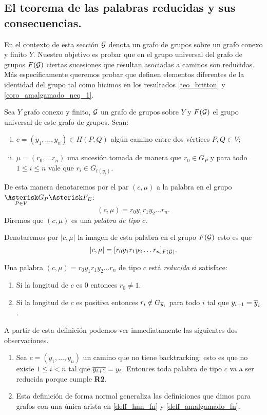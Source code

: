 \documentclass[tesis.tex]{subfiles}
\begin{document}
\subsection{ El teorema de las palabras reducidas y sus consecuencias.}

En el contexto de esta sección ${\cal G}$ denota un grafo de grupos sobre un grafo conexo y finito $Y$.
Nuestro objetivo es probar que en el grupo universal del grafo de grupos $F({\cal G})$ ciertas sucesiones que resultan asociadas a caminos son reducidas.
Más específicamente queremos probar que definen elementos diferentes de la identidad del grupo tal como hicimos en los resultados \ref{teo_britton} y \ref{coro_amalgamado_neq_1}.



\begin{deff}
	Sea $Y$ grafo conexo y finito, ${\cal G}$ un grafo de grupos sobre $Y$ y $F({\cal G})$ el grupo universal de este grafo de grupos.
	Sean:
	\begin{enumerate}[i)]
		\item $c=(y_1, \dots, y_n) \in \Pi(P,Q)$ algún camino entre dos vértices $P,Q \in V$;
		\item $\mu = (r_0, \dots r_n)$ una sucesión tomada de manera que $r_0 \in G_P$ y para todo $ 1 \le i \le n $ vale que $r_i \in G_{t(y_i)}$.
	\end{enumerate}
	De esta manera denotaremos por el par $(c, \mu)$ a la palabra en el grupo $\underset{P \in V}{\Asterisk} G_P \Asterisk F_E$:
	\[
	(c,\mu) = r_0 y_1 r_1 y_2 \dots r_n.
	\]
	Diremos que $(c, \mu)$ es una \emph{palabra de tipo $c$}.
\end{deff}
 
Denotaremos por $|c,\mu|$ la imagen de esta palabra en el grupo $F({\cal G})$ esto es que
\[
|c,\mu| = [r_0 y_1 r_1 y_2 \dots r_n]_{F({\cal G})}.
\]

\begin{deff}
	Una palabra $(c, \mu)=r_0 y_1 r_1 y_2 \dots r_n$ de tipo $c$ está \emph{reducida} si satisface:
	\begin{enumerate}[R1.]
		\item Si la longitud de $c$ es $0$ entonces $r_0 \neq 1$.
		\item Si la longitud de $c$ es positiva entonces $r_i \notin G_{\overline y_{i}}$ para todo $i$ tal que $y_{i+1} = \overline y_{i}$.
	\end{enumerate}
\end{deff}
A partir de esta definición podemos ver inmediatamente las siguientes dos observaciones.
\begin{enumerate}[1.]
	\item Sea $c=(y_1, \dots, y_n)$ un camino que no tiene backtracking: esto es que no existe $1 \le i  < n$ tal que $\overline {y_{i+1}} = y_{i}$.
	Entonces toda palabra de tipo $c$ va a ser reducida porque cumple \textbf{R2}.
	
	\item Esta definición de forma normal generaliza las definiciones que dimos para grafos con una única arista en \ref{deff_hnn_fn} y \ref{deff_amalgamado_fn}.
\end{enumerate}
\end{document}
